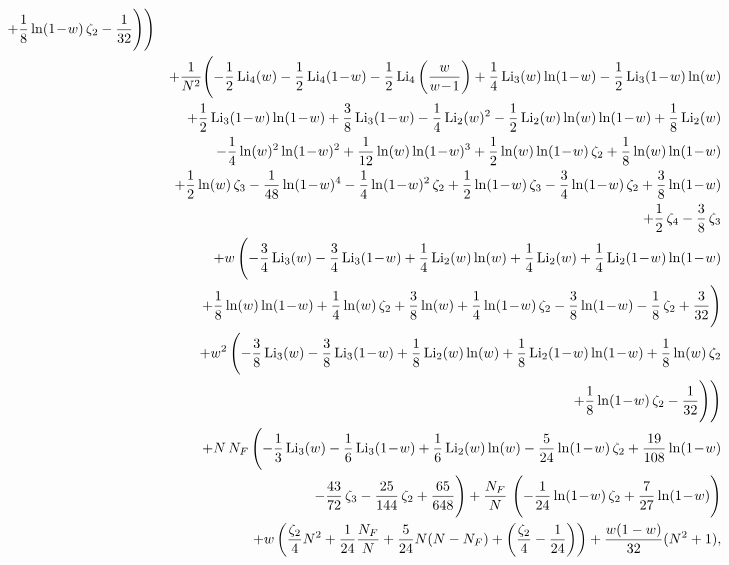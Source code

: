 \documentclass[paper,notoc,nohyper]{JHEP3}
\def\NF{N_F}
\def\lx{\ln(w)}
\def\ly{\ln(1\!-\!w)}
\def\Libx{{\rm Li}_2(w)}
\def\Licx{{\rm Li}_3(w)}
\def\Lidx{{\rm Li}_4(w)}
\def\Liby{{\rm Li}_2(1\!-\!w)}
\def\Licy{{\rm Li}_3(1\!-\!w)}
\def\Lidy{{\rm Li}_4(1\!-\!w)}
\def\Lidz{{\rm Li}_4\left(\frac{w}{w\!-\!1}\right)}
\begin{document}
\begin{eqnarray}
+{1\over 8}\,{\ly}\,{\zeta_2}-{1\over 32}\Biggr )\Biggr )\nonumber \\&&
+{1\over N^2}\Biggl (-{1\over 2}\,{\Lidx}-{1\over 2}\,{\Lidy}-{1\over 2}\,{\Lidz}+{1\over 4}\,{\Licx}\,{\ly}-{1\over 2}\,{\Licy}\,{\lx}\nonumber \\&&
+{1\over 2}\,{\Licy}\,{\ly}+{3\over 8}\,{\Licy}-{1\over 4}\,{\Libx^2}-{1\over 2}\,{\Libx}\,{\lx}\,{\ly}+{1\over 8}\,{\Libx}\nonumber \\&&
-{1\over 4}\,{\lx^2}\,{\ly^2}+{1\over 12}\,{\lx}\,{\ly^3}+{1\over 2}\,{\lx}\,{\ly}\,{\zeta_2}+{1\over 8}\,{\lx}\,{\ly}\nonumber \\&&
+{1\over 2}\,{\lx}\,{\zeta_3}-{1\over 48}\,{\ly^4}-{1\over 4}\,{\ly^2}\,{\zeta_2}+{1\over 2}\,{\ly}\,{\zeta_3}-{3\over 4}\,{\ly}\,{\zeta_2}+{3\over 8}\,{\ly}\nonumber \\&&
+{1\over 2}\,{\zeta_4}-{3\over 8}\,{\zeta_3}\nonumber \\&&
+{w}\,\Biggl (-{3\over 4}\,{\Licx}-{3\over 4}\,{\Licy}+{1\over 4}\,{\Libx}\,{\lx}+{1\over 4}\,{\Libx}+{1\over 4}\,{\Liby}\,{\ly}\nonumber \\&&
+{1\over 8}\,{\lx}\,{\ly}+{1\over 4}\,{\lx}\,{\zeta_2}+{3\over 8}\,{\lx}+{1\over 4}\,{\ly}\,{\zeta_2}-{3\over 8}\,{\ly}-{1\over 8}\,{\zeta_2}+{3\over 32}\Biggr )\nonumber \\&&
+{w^2}\,\Biggl (-{3\over 8}\,{\Licx}-{3\over 8}\,{\Licy}+{1\over 8}\,{\Libx}\,{\lx}+{1\over 8}\,{\Liby}\,{\ly}+{1\over 8}\,{\lx}\,{\zeta_2}\nonumber \\&&
+{1\over 8}\,{\ly}\,{\zeta_2}-{1\over 32}\Biggr )\Biggr )\nonumber \\&&
+{N}\,{\NF}\,\Biggl (-{1\over 3}\,{\Licx}-{1\over 6}\,{\Licy}+{1\over 6}\,{\Libx}\,{\lx}-{5\over 24}\,{\ly}\,{\zeta_2}+{19\over 108}\,{\ly}\nonumber \\&&
-{43\over 72}\,{\zeta_3}-{25\over 144}\,{\zeta_2}+{65\over 648}\Biggr )
+{\NF\over N}\,{}\,\Biggl (-{1\over 24}\,{\ly}\,{\zeta_2}+{7\over 27}\,{\ly}\Biggr )\nonumber \\&&
+w\left(\frac{\zeta_2}{4}N^2+\frac{1}{24}\frac{\NF}{N}
+\frac{5}{24}N(N-\NF)+\left(\frac{\zeta_2}{4}-\frac{1}{24}\right)
\right)+\frac{w(1-w)}{32}(N^2+1),
\end{eqnarray}
\end{document}
